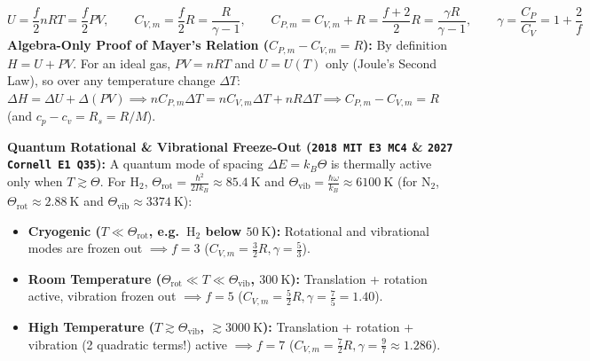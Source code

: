 \begin{formulacard}
\begin{equation}\label{eq:06:equipartition}
  \boxed{U = \frac{f}{2}nRT = \frac{f}{2}PV}, \qquad \boxed{C_{V,m} = \frac{f}{2}R = \frac{R}{\gamma - 1}}, \qquad \boxed{C_{P,m} = C_{V,m} + R = \frac{f+2}{2}R = \frac{\gamma R}{\gamma - 1}}, \qquad \boxed{\gamma = \frac{C_P}{C_V} = 1 + \frac{2}{f}}
\end{equation}
\textbf{Algebra-Only Proof of Mayer's Relation ($C_{P,m} - C_{V,m} = R$):} By definition $H = U + PV$. For an ideal gas, $PV = nRT$ and $U = U(T)$ only (Joule's Second Law), so over any temperature change $\Delta T$: $\Delta H = \Delta U + \Delta(PV) \implies nC_{P,m}\Delta T = nC_{V,m}\Delta T + nR\Delta T \implies C_{P,m} - C_{V,m} = R$ (and $c_p - c_v = R_s = R/M$).
\par\smallskip\noindent
\textbf{Quantum Rotational \& Vibrational Freeze-Out (\texttt{2018 MIT E3 MC4} \& \texttt{2027 Cornell E1 Q35}):} A quantum mode of spacing $\Delta E = k_B\Theta$ is thermally active only when $T \gtrsim \Theta$. For $\mathrm{H_2}$, $\Theta_{\mathrm{rot}} = \frac{\hbar^2}{2I k_B} \approx \SI{85.4}{\kelvin}$ and $\Theta_{\mathrm{vib}} = \frac{\hbar\omega}{k_B} \approx \SI{6100}{\kelvin}$ (for $\mathrm{N_2}$, $\Theta_{\mathrm{rot}} \approx \SI{2.88}{\kelvin}$ and $\Theta_{\mathrm{vib}} \approx \SI{3374}{\kelvin}$):
\begin{itemize}
  \item \textbf{Cryogenic ($T \ll \Theta_{\mathrm{rot}}$, e.g.\ $\mathrm{H_2}$ below $\SI{50}{\kelvin}$):} Rotational and vibrational modes are frozen out $\implies f = 3$ ($C_{V,m} = \frac{3}{2}R, \gamma = \frac{5}{3}$).
  \item \textbf{Room Temperature ($\Theta_{\mathrm{rot}} \ll T \ll \Theta_{\mathrm{vib}}$, $\SI{300}{\kelvin}$):} Translation + rotation active, vibration frozen out $\implies f = 5$ ($C_{V,m} = \frac{5}{2}R, \gamma = \frac{7}{5} = 1.40$).
  \item \textbf{High Temperature ($T \gtrsim \Theta_{\mathrm{vib}}$, $\gtrsim \SI{3000}{\kelvin}$):} Translation + rotation + vibration (2 quadratic terms!) active $\implies f = 7$ ($C_{V,m} = \frac{7}{2}R, \gamma = \frac{9}{7} \approx 1.286$).
\end{itemize}
\end{formulacard}

